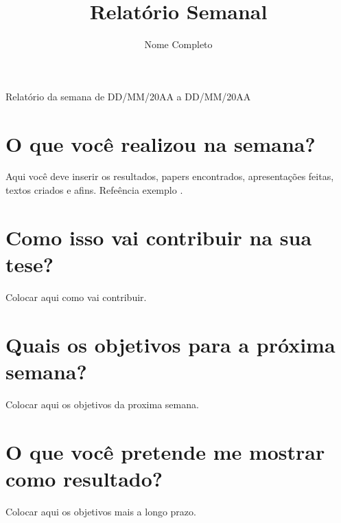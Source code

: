 \documentclass[12pt]{article}
\title{Relatório Semanal}
\author{Nome Completo}
\begin{document}
 

\maketitle

\begin{resumo} 
  Relatório da semana de DD/MM/20AA a DD/MM/20AA
\end{resumo}

 
\section{O que você realizou na semana?}
Aqui você deve inserir os resultados, papers encontrados, apresentações feitas, textos criados e afins. Refeência exemplo \cite{aquino2016hephaestus}.


\section{Como isso vai contribuir na sua tese?} 
Colocar aqui como vai contribuir.


\section{Quais os objetivos para a próxima semana?}
Colocar aqui os objetivos da proxima semana.


\section{O que você pretende me mostrar como resultado?}
Colocar aqui os objetivos mais a longo prazo.




\end{document}
